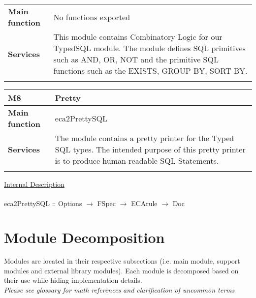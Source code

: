 \documentclass[12pt, svgnames]{article}
\begin{document}
{{{{{{{\begin{tabularx}{\textwidth}{>{\bfseries}m{5cm}X}
        Main function  & No functions exported
        \\	Services &  This module contains Combinatory Logic for our TypedSQL module. The module defines SQL primitives such as AND, OR, NOT and the primitive SQL functions such as the EXISTS, GROUP BY, SORT BY.
        \\       
        \vspace{12pt}
    \end{tabularx}\vspace{3em}
    {\setlength{\tabcolsep}{6pt} 
        \begin{tabularx}{\textwidth}{>{\bfseries}m{5cm}X}
            M8 & Pretty \\ 
            \midrule
            
            Main function  & eca2PrettySQL
            \\	Services &  The module contains a pretty printer for the Typed SQL types. The intended purpose of this pretty printer is to produce human-readable SQL Statements.
            \\       
            \vspace{12pt}
        \end{tabularx}\vspace{3em}
\underline{Internal Description}\\ \\
eca2PrettySQL :: Options $\rightarrow$ FSpec $\rightarrow$ ECArule $\rightarrow$ Doc

\section{Module Decomposition} \label{SecMD}
Modules are located in their respective subsections (i.e. main module, support 
modules and external library modules). Each module is decomposed based on their 
use while hiding implementation details. 
\\ \newline
\textit{Please see glossary for math references and clarification of uncommon 
terms}

        
}}}}}}}}
\end{document}
